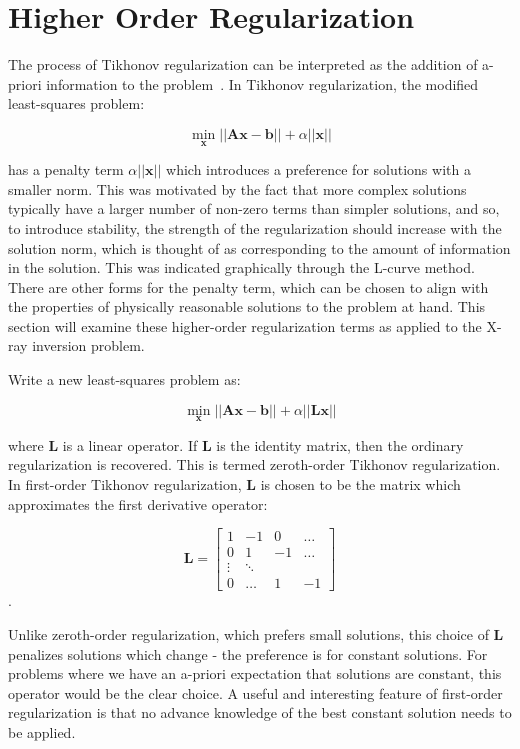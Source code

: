\section{Higher Order Regularization}

The process of Tikhonov regularization can be interpreted as the addition of a-priori information to the problem~\citep{Tikhonov1995NumericalMF}. In Tikhonov regularization, the modified least-squares problem:

$$\min_{\mathbf{x}} \vert \vert \mathbf{A} \mathbf{x} - \mathbf{b} \vert \vert + \alpha \vert \vert \mathbf{x} \vert \vert$$

has a penalty term  $\alpha \vert \vert \mathbf{x} \vert \vert$ which introduces a preference for solutions with a smaller norm. This was motivated by the fact that more complex solutions typically have a larger number of non-zero terms than simpler solutions, and so, to introduce stability, the strength of the regularization should increase with the solution norm, which is thought of as corresponding to the amount of information in the solution. This was indicated graphically through the L-curve method. There are other forms for the penalty term, which can be chosen to align with the properties of physically reasonable solutions to the problem at hand. This section will examine these higher-order regularization terms as applied to the X-ray inversion problem. 

Write a new least-squares problem as:

$$\min_{\mathbf{x}} \vert \vert \mathbf{A} \mathbf{x} - \mathbf{b} \vert \vert + \alpha \vert \vert \mathbf{L} \mathbf{x} \vert \vert$$

where $\mathbf{L}$ is a linear operator. If $\mathbf{L}$ is the identity matrix, then the ordinary regularization is recovered. This is termed zeroth-order Tikhonov regularization. In first-order Tikhonov regularization, $\mathbf{L}$ is chosen to be the matrix which approximates the first derivative operator:

\[
\mathbf{L} = \begin{bmatrix} 
    1 & -1 & 0 & \dots \\
    0 & 1 & -1 &\dots \\
    \vdots & \ddots & \\
    0 & \dots & 1 & -1 
    \end{bmatrix}
\].

Unlike zeroth-order regularization, which prefers small solutions, this choice of $\mathbf{L}$ penalizes solutions which change - the preference is for constant solutions. For problems where we have an a-priori expectation that solutions are constant, this operator would be the clear choice. A useful and interesting feature of first-order regularization is that no advance knowledge of the best constant solution needs to be applied. 

